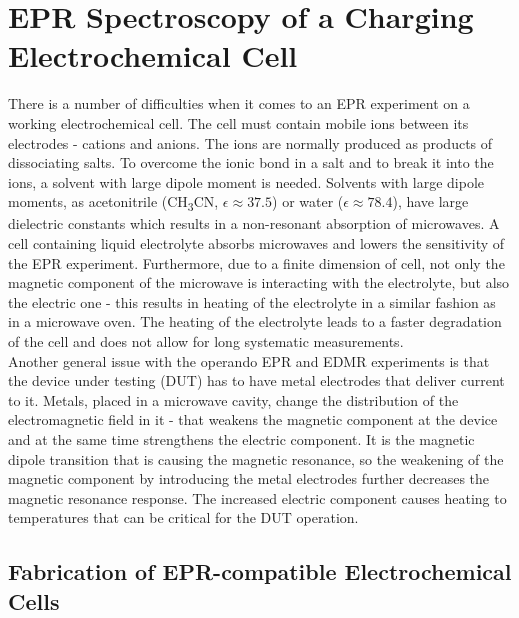 \section{EPR Spectroscopy of a Charging Electrochemical Cell}
There is a number of difficulties when it comes to an EPR experiment on a working electrochemical cell. The cell must contain mobile ions between its electrodes - cations and anions. The ions are normally produced as products of dissociating salts. To overcome the ionic bond in a salt and to break it into the ions, a solvent with large dipole moment is needed. Solvents with large dipole moments, as acetonitrile (CH\textsubscript{3}CN, $\epsilon\approx 37.5$) or water ($\epsilon\approx78.4$), have large dielectric constants which results in a non-resonant absorption of microwaves. A cell containing liquid electrolyte absorbs microwaves and lowers the sensitivity of the EPR experiment. Furthermore, due to a finite dimension of cell, not only the magnetic component of the microwave is interacting with the electrolyte, but also the electric one - this results in heating of the electrolyte in a similar fashion as in a microwave oven. The heating of the electrolyte leads to a faster degradation of the cell and does not allow for long systematic measurements.\\
Another general issue with the operando EPR and EDMR experiments is that the device under testing (DUT) has to have metal electrodes that deliver current to it. Metals, placed in a microwave cavity, change the distribution of the electromagnetic field in it - that weakens the magnetic component at the device and at the same time strengthens the electric component. It is the magnetic dipole transition that is causing the magnetic resonance, so the weakening of the magnetic component by introducing the metal electrodes further decreases the magnetic resonance response. The increased electric component causes heating to temperatures that can be critical for the DUT operation.

\subsection{Fabrication of EPR-compatible Electrochemical Cells}

